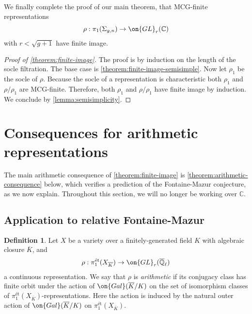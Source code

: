 \documentclass[12 pt]{amsart}
\theoremstyle{plain}
\theoremstyle{definition}
\newtheorem{definition}[subsubsection]{Definition}
\theoremstyle{remark}
\numberwithin{equation}{section}
\begin{document}
\subsection{}
\label{subsection:main-proof}
We finally complete the proof of our main theorem, that 
MCG-finite representations $$\rho: \pi_1(\Sigma_{g,n})\to
\on{GL}_r(\mathbb{C})$$ with $r<\sqrt{g+1}$ have finite image.
\begin{proof}[Proof of \autoref{theorem:finite-image}]
The proof is by induction on the length of the socle filtration. The base case is \autoref{theorem:finite-image-semisimple}. Now let $\rho_1$ be the socle of $\rho$.	Because the socle of a representation is characteristic both $\rho_1$
	and $\rho/\rho_1$ are
	 MCG-finite. 
	Therefore, both $\rho_1$ and $\rho/\rho_1$ have finite image by induction.
	We conclude by \autoref{lemma:semisimplicity}.
\end{proof}

\section{Consequences for arithmetic representations}\label{section:arithmetic-applications}
The main arithmetic consequence of \autoref{theorem:finite-image} is \autoref{theorem:arithmetic-consequence} below, which verifies a prediction of the Fontaine-Mazur conjecture, as we now explain. 
Throughout this section, we will no longer be working over $\mathbb C$.

\subsection{Application to relative Fontaine-Mazur}
\label{subsection:application-fontaine-mazur}
\begin{definition}
	\label{definition:arithmetic}
	Let $X$ be a variety over a finitely-generated field $K$ with algebraic closure $\overline{K}$, and 
$$\rho: \pi_1^{\text{\'et}}(X_{\overline{K}})\to
\on{GL}_r(\overline{\mathbb{Q}}_\ell)$$ a
continuous representation. We
say that $\rho$ is \emph{arithmetic} if its conjugacy class has finite orbit
under the action of $\on{Gal}(\overline{K}/K)$ on the set of isomorphism classes of
$\pi_1^{\text{\'et}}(X_{\overline{K}})$-representations. Here the action is
induced by the natural outer action of $\on{Gal}(\overline{K}/K)$ on
$\pi_1^{\text{\'et}}(X_{\overline{K}})$. 
\end{definition}
\end{document}
